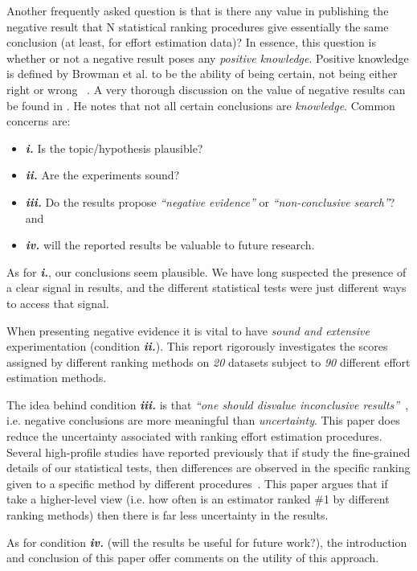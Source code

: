 \documentclass{sig-alternate}
\newcommand{\bi}{\begin{itemize}}
\newcommand{\ei}{\end{itemize}}
\begin{document}
Another frequently asked question is that is there any 
value in publishing the negative result 
that   N statistical ranking procedures give essentially
the same conclusion (at least, for effort estimation data)?
In essence, this question is whether or not a
negative result poses any {\em positive knowledge}.
Positive knowledge is defined by Browman et al. to
be the ability of being certain, not being either
right or wrong~ \cite{Browman1999}.  A very thorough
discussion on the value of negative results can be
found in \cite{Browman1999}.
He notes that 
not all certain conclusions are \textit{knowledge}.
Common concerns are: 
\bi
\item[\textbf{\textit{i.}}] Is the topic/hypothesis plausible?
\item[\textbf{\textit{ii.}}] Are the experiments sound? 
\item[\textbf{\textit{iii.}}] Do the results propose \textit{``negative evidence''} 
or \textit{``non-conclusive search''}? and 
\item[\textbf{\textit{iv.}}] will the reported results be valuable to future research.
\ei
As for \textbf{\textit{i.}}, our conclusions 
seem plausible. We have long suspected the presence of a clear
signal in results, and the different statistical tests
were just different ways to access that signal. 

When presenting negative evidence it is vital
 to have \textit{sound and extensive}
experimentation (condition \textbf{\textit{ii.}}).
This report rigorously investigates the scores
assigned by different ranking methods on \textit{20}
datasets subject to \textit{90} different effort
estimation methods. 

The idea behind condition \textbf{\textit{iii.}} is
that \textit{``one should disvalue inconclusive
  results''}~\cite{Browman1999}, i.e. negative
conclusions are more meaningful than
\textit{uncertainty}.  This paper does reduce
the uncertainty associated with ranking effort
estimation procedures.
Several high-profile studies have reported
previously that if study the fine-grained
details of our statistical tests,
then differences are observed in the
specific ranking given to a specific method by 
different procedures~\cite{shepperd01,myrtveit05}.
This paper argues that if take a higher-level
view (i.e. how often is an estimator ranked \#1 by
different ranking methods) then there is far
less uncertainty in the results.



As for condition \textbf{\textit{iv.}} (will the
results be useful for future work?), the introduction
and conclusion of this paper offer comments on the
utility of this approach.  
\end{document}
